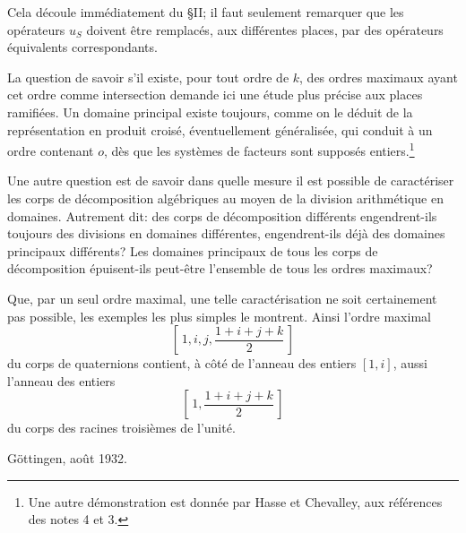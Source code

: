 Cela découle immédiatement du \S{}II; il faut seulement remarquer que les opérateurs \(u_S\) doivent être remplacés, aux différentes places, par des opérateurs équivalents correspondants.

La question de savoir s'il existe, pour tout ordre de \(k\), des ordres maximaux ayant cet ordre comme intersection demande ici une étude plus précise aux places ramifiées. Un domaine principal existe toujours, comme on le déduit de la représentation en produit croisé, éventuellement généralisée, qui conduit à un ordre contenant \(o\), dès que les systèmes de facteurs sont supposés entiers.\footnote{Une autre démonstration est donnée par Hasse et Chevalley, aux références des notes 4 et 3.}

Une autre question est de savoir dans quelle mesure il est possible de caractériser les corps de décomposition algébriques au moyen de la division arithmétique en domaines. Autrement dit: des corps de décomposition différents engendrent-ils toujours des divisions en domaines différentes, engendrent-ils déjà des domaines principaux différents? Les domaines principaux de tous les corps de décomposition épuisent-ils peut-être l'ensemble de tous les ordres maximaux?

Que, par un seul ordre maximal, une telle caractérisation ne soit certainement pas possible, les exemples les plus simples le montrent. Ainsi l'ordre maximal
\[
        \left[\,1,i,j,\frac{1+i+j+k}{2}\,\right]
\]
du corps de quaternions contient, à côté de l'anneau des entiers \([1,i]\), aussi l'anneau des entiers
\[
        \left[\,1,\frac{1+i+j+k}{2}\,\right]
\]
du corps des racines troisièmes de l'unité.

\begin{flushleft}
Göttingen, août 1932.
\end{flushleft}
\clearpage

\setcounter{footnote}{0}
